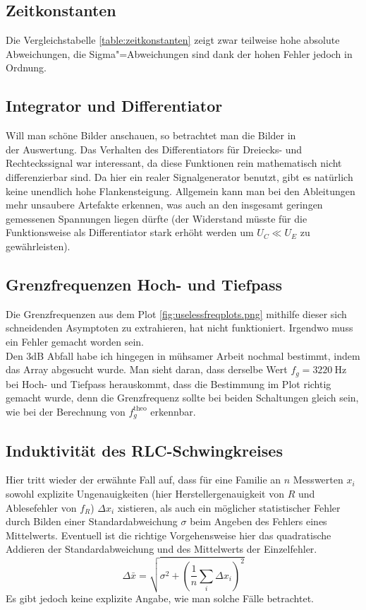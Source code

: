 \subsection{Zeitkonstanten} 
Die Vergleichstabelle \ref{table:zeitkonstanten} zeigt zwar teilweise hohe absolute Abweichungen, die Sigma"=Abweichungen sind dank der hohen Fehler jedoch in Ordnung.

\subsection{Integrator und Differentiator}
Will man schöne Bilder anschauen, so betrachtet man die Bilder in \\ der Auswertung. Das Verhalten des Differentiators für Dreiecks- und Rechteckssignal war interessant, da diese Funktionen rein mathematisch nicht differenzierbar sind. Da hier ein realer Signalgenerator benutzt, gibt es natürlich keine unendlich hohe Flankensteigung. Allgemein kann man bei den Ableitungen mehr unsaubere Artefakte erkennen, was auch an den insgesamt geringen gemessenen Spannungen liegen dürfte (der Widerstand müsste für die Funktionsweise als Differentiator stark erhöht werden um \(U_C\ll U_E\) zu gewährleisten). 

\subsection{Grenzfrequenzen Hoch- und Tiefpass} 
Die Grenzfrequenzen aus dem Plot \ref{fig:uselessfreqplots.png} mithilfe dieser sich schneidenden Asymptoten zu extrahieren, hat nicht funktioniert. Irgendwo muss ein Fehler gemacht worden sein.\\
Den 3dB Abfall habe ich hingegen in mühsamer Arbeit nochmal bestimmt, indem das Array abgesucht wurde. Man sieht daran, dass derselbe Wert \(f_g=\qty{3220}{\hertz}\) bei Hoch- und Tiefpass herauskommt, dass die Bestimmung im Plot richtig gemacht wurde, denn die Grenzfrequenz sollte bei beiden Schaltungen gleich sein, wie bei der Berechnung von \(f_g^\text{theo}\) erkennbar.

\subsection{Induktivität des RLC-Schwingkreises}
Hier tritt wieder der erwähnte Fall auf, dass für eine Familie an \(n\) Messwerten \(x_i\) sowohl explizite Ungenauigkeiten (hier Herstellergenauigkeit von \(R\) und Ablesefehler von \(f_R\)) \(\Delta x_i\) xistieren, als auch ein möglicher statistischer Fehler durch Bilden einer Standardabweichung \(\sigma\) beim Angeben des Fehlers eines Mittelwerts. Eventuell ist die richtige Vorgehensweise hier das quadratische Addieren der Standardabweichung und des Mittelwerts der Einzelfehler. 
\begin{equation}
    \Delta \bar{x}=\sqrt{\sigma^2+\left(\frac{1}{n}\sum_i \Delta x_i\right)^2}
    \label{eq:fehleraddition}
\end{equation}
Es gibt jedoch keine explizite Angabe, wie man solche Fälle betrachtet. 

